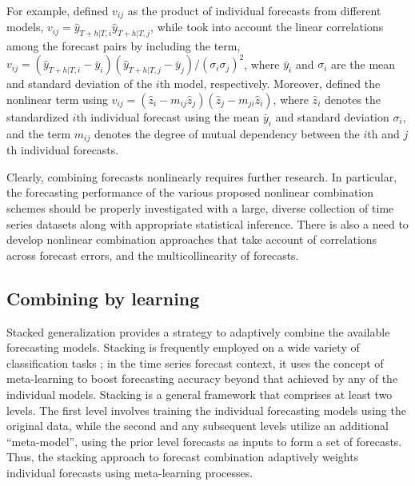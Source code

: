 \documentclass[11pt]{article}
\begin{document}
For example, \citet{Freitas2006-fn} defined $v_{i j}$ as the product of individual forecasts from different models, $v_{ij} = \hat{y}_{T+h|T, i} \hat{y}_{T+h|T, j}$, while \citet{Adhikari2012-ur} took into account the linear correlations among the forecast pairs by including the term, $v_{ij} = (\hat{y}_{T+h|T, i}-\bar{y}_{i})(\hat{y}_{T+h|T, j}-\bar{y}_{j})/(\sigma_{i}\sigma_{j})^2$, where $\bar{y}_{i}$ and $\sigma_{i}$ are the mean and standard deviation of the $i$th model, respectively. Moreover, \citet{Adhikari2015-bb} defined the nonlinear term using $v_{ij} = \left(\hat{z}_{i}-m_{i j} \hat{z}_{j}\right)\left(\hat{z}_{j}-m_{j i} \hat{z}_{i}\right)$, where $\hat{z}_{i}$ denotes the standardized $i$th individual forecast using the mean $\bar{y}_{i}$ and standard deviation $\sigma_{i}$, and the term $m_{i j}$ denotes the degree of mutual dependency between the $i$th and $j$th individual forecasts.

Clearly, combining forecasts nonlinearly requires further research. In particular, the forecasting performance of the various proposed nonlinear combination schemes should be properly investigated with a large, diverse collection of time series datasets along with appropriate statistical inference. There is also a need to develop nonlinear combination approaches that take account of correlations across forecast errors, and the multicollinearity of forecasts.

\subsection{Combining by learning}
\label{sec:comb_learn}

Stacked generalization \citep[stacking,][]{Wolpert1992-if} provides a strategy to adaptively combine the available forecasting models. Stacking is frequently employed on a wide variety of classification tasks \citep{Zhou2012-cy}; in the time series forecast context, it uses the concept of meta-learning to boost forecasting accuracy beyond that achieved by any of the individual models. Stacking is a general framework that comprises at least two levels. The first level involves training the individual forecasting models using the original data, while the second and any subsequent levels utilize an additional ``meta-model'', using the prior level forecasts as inputs to form a set of forecasts. Thus, the stacking approach to forecast combination adaptively weights individual forecasts using meta-learning processes.
\end{document}
